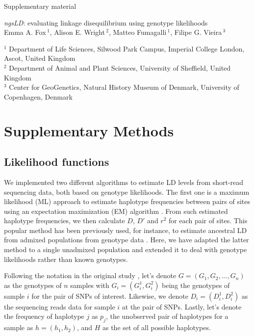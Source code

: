 \documentclass[a4paper]{article}
\begin{document}
\begin{center}
\LARGE Supplementary material\\[3ex]
\end{center}
\noindent \LARGE \textit{ngsLD}: evaluating linkage disequilibrium using genotype likelihoods\\

\noindent \large Emma A. Fox\,$^{1}$, Alison E. Wright\,$^{2}$, Matteo Fumagalli\,$^{1}$, Filipe G. Vieira\,$^{3}$
\begin{center}
\begin{flushleft}
$^1$ Department of Life Sciences, Silwood Park Campus, Imperial College London, Ascot, United Kingdom\\
$^2$ Department of Animal and Plant Sciences, University of Sheffield, United Kingdom\\
$^3$ Center for GeoGenetics, Natural History Museum of Denmark, University of Copenhagen, Denmark
\end{flushleft}
\end{center}


\section{Supplementary Methods}

\subsection{Likelihood functions}
We implemented two different algorithms to estimate LD levels from short-read sequencing data, both based on genotype likelihoods. 
The first one is a maximum likelihood (ML) approach to estimate haplotype frequencies between pairs of sites using an expectation maximization (EM) algorithm \citep{Excoffier1995}. From such estimated haplotype frequencies, we then calculate $D$, $D'$ and $r^2$ for each pair of sites. This popular method has been previously used, for instance, to estimate ancestral LD from admixed populations from genotype data \citep{Moltke2015}. Here, we have adapted the latter method to a single unadmixed population and extended it to deal with genotype likelihoods rather than known genotypes.

Following the notation in the original study \citep{Moltke2015}, let's denote $G=(G_1, G_2, ..., G_n)$ as the genotypes of $n$ samples with $G_i=(G_i^1,G_i^2)$ being the genotypes of sample $i$ for the pair of SNPs of interest. Likewise, we denote $D_i=(D_i^1,D_i^2)$ as the sequencing reads data for sample $i$ at the pair of SNPs. Lastly, let's denote the frequency of haplotype $j$ as $p_j$, the unobserved pair of haplotypes for a sample as $h=(h_1,h_2)$, and $H$ as the set of all possible haplotypes.
\end{document}
